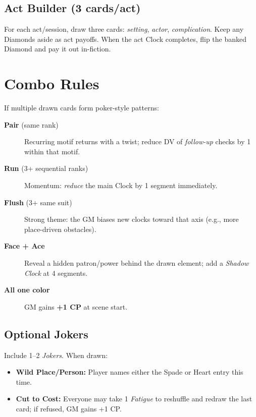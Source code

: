 \begin{multicols}{2}
\subsection*{Act Builder (3 cards/act)}
For each act/session, draw three cards: \emph{setting}, \emph{actor}, \emph{complication}. Keep any Diamonds aside as act payoffs. When the act Clock completes, flip the banked Diamond and pay it out in-fiction.

\section{Combo Rules}
If multiple drawn cards form poker-style patterns:
\begin{description}
  \item[\textbf{Pair} (same rank)] Recurring motif returns with a twist; reduce DV of \emph{follow-up} checks by 1 within that motif.
  \item[\textbf{Run} (3+ sequential ranks)] Momentum: \emph{reduce} the main Clock by 1 segment immediately.
  \item[\textbf{Flush} (3+ same suit)] Strong theme: the GM biases new clocks toward that axis (e.g., more place-driven obstacles).
  \item[\textbf{Face + Ace}] Reveal a hidden patron/power behind the drawn element; add a \emph{Shadow Clock} at 4 segments.
  \item[\textbf{All one color}] GM gains \textbf{+1 CP} at scene start.
\end{description}

\subsection*{Optional Jokers}
Include 1–2 \emph{Jokers}. When drawn:
\begin{itemize}
  \item \textbf{Wild Place/Person:} Player names either the Spade or Heart entry this time.
  \item \textbf{Cut to Cost:} Everyone may take 1 \emph{Fatigue} to reshuffle and redraw the last card; if refused, GM gains +1 CP.
\end{itemize}


\end{multicols}
